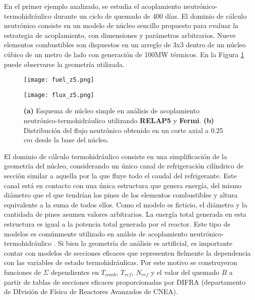 En el primer ejemplo analizado, se estudia el acoplamiento neutrónico-termohidráulico durante un ciclo de quemado de 400 días.
El dominio de cálculo neutrónico consiste en un modelo de núcleo sencillo propuesto para evaluar la estrategia de acoplamiento,
con dimensiones y parámetros arbitrarios.
Nueve elementos combustibles son dispuestos en un arreglo de 3x3 dentro de un núcleo cúbico de un metro de lado con generación de 100MW térmicos.
En la Figura \ref{fuel_z5} puede observarse la geometría utilizada.

\begin{figure}[ht]
	\begin{minipage}{0.5\linewidth}
		\centering
		\texttt{[image: fuel\_z5.png]}
	\end{minipage}
	\begin{minipage}{0.5\linewidth}
		\centering
		\texttt{[image: flux\_z5.png]}
	\end{minipage}
\caption[Núcleo simple en análisis de acoplamiento neutrónico-termohidráulico utilizando \textit{RELAP5} y \textit{Fermi}]
{\textbf{(a)} Esquema de núcleo simple en análisis de acoplamiento neutrónico-termohidráulico utilizando \textbf{RELAP5} y \textbf{Fermi}.
\textbf{(b)} Distribución del flujo neutrónico obtenido en un corte axial a 0.25 $cm$ desde la base del núcleo.
}
\label{fuel_z5}
\end{figure}
El dominio de cálculo termohidráulico consiste en una simplificación de la geometría del núcleo,
considerando un único canal de refrigeración cilíndrico de sección similar a aquella por la que fluye todo el caudal del refrigerante.
Este canal está en contacto con una única estructura que genera energía, 
del mismo diámetro que el que tendrían los pines de los elementos combustibles y altura equivalente a la suma de todos ellos.
Como el modelo es ficticio, el diámetro y la cantidada de pines asumen valores arbitrarios.
La energía total generada en esta estructura es igual a la potencia total generada por el reactor. 
Este tipo de modelos es comúnmente utilizado en análsis de acoplamiento neutrónico-termohidráulico \cite{pumita-relap}.
Si bien la geometría de análisis es artificial, 
es importante contar con modelos de secciones eficaces que representen fielmente la dependencia con las variables de estado termohidráulicas.
Por este motivo se construyeron funciones de $\Sigma$ dependientes en $T_{comb}$, $T_{ref}$, $N_{ref}$ y el valor del quemado $B$
a partir de tablas de secciones eficaces proporcionadas por DIFRA (departamento de DIvisión de Física de Reactores Avanzados de CNEA).


